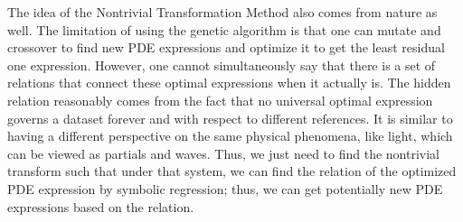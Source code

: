\documentclass[12pt]{article}
\begin{document}
The idea of the Nontrivial Transformation Method also comes from nature as well. The limitation of using the genetic algorithm is that one can mutate and crossover to find new PDE expressions and optimize it to get the least residual one expression. However, one cannot simultaneously say that there is a set of relations that connect these optimal expressions when it actually is. The hidden relation reasonably comes from the fact that no universal optimal expression governs a dataset forever and with respect to different references. It is similar to having a different perspective on the same physical phenomena, like light, which can be viewed as partials and waves. Thus, we just need to find the nontrivial transform such that under that system, we can find the relation of the optimized PDE expression by symbolic regression; thus, we can get potentially new PDE expressions based on the relation. 
\end{document}
